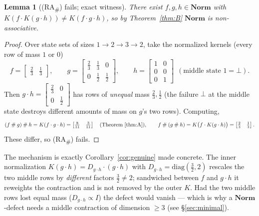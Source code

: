 \documentclass[11pt]{amsart}
\theoremstyle{plain}
\newtheorem{lemma}[theorem]{Lemma}
\theoremstyle{definition}
\theoremstyle{remark}
\newcommand{\Norm}{\mathbf{Norm}}
\newcommand{\sh}{\mathbin{\#}}
\newcommand{\RA}{\textsf{(RA}\textsubscript{\#}\textsf{)}}
\begin{document}
\begin{lemma}[\RA{} fails; exact witness]
\label{lem:norm-RA}
There exist $f,g,h\in\Norm$ with $K(f\cdot K(g\cdot h))\ne K(f\cdot g\cdot h)$, so by
Theorem~\ref{thm:B} $\Norm$ is non-associative.
\end{lemma}
\begin{proof}
Over state sets of sizes $1\to 2\to 3\to 2$, take the normalized kernels (every row of mass $1$ or
$0$)
\[
  f=\begin{bmatrix}\tfrac23 & \tfrac13\end{bmatrix},\qquad
  g=\begin{bmatrix}\tfrac23 & \tfrac13 & 0\\[2pt] 0 & \tfrac12 & \tfrac12\end{bmatrix},\qquad
  h=\begin{bmatrix}1&0\\0&0\\0&1\end{bmatrix}\ \ (\text{middle state }1=\bot).
\]
Then $g\cdot h=\begin{bmatrix}\tfrac23&0\\0&\tfrac12\end{bmatrix}$ has rows of \emph{unequal} mass
$\tfrac23,\tfrac12$ (the failure $\bot$ at the middle state destroys different amounts of mass on
$g$'s two rows). Computing,
\[
  (f\sh g)\sh h = K(f\cdot g\cdot h) = \begin{bmatrix}\tfrac{8}{11}&\tfrac{3}{11}\end{bmatrix}
  \quad(\text{Theorem~\ref{thm:A}}),\qquad
  f\sh(g\sh h) = K\big(f\cdot K(g\cdot h)\big) = \begin{bmatrix}\tfrac23&\tfrac13\end{bmatrix}.
\]
These differ, so \RA{} fails.
\end{proof}

The mechanism is exactly Corollary~\ref{cor:genuine} made concrete. The inner normalization
$K(g\cdot h)=D_{g\cdot h}\cdot(g\cdot h)$ with $D_{g\cdot h}=\mathrm{diag}(\tfrac32,2)$ rescales the two
middle rows by \emph{different} factors $\tfrac32\ne 2$; sandwiched between $f$ and $g\cdot h$ it
reweights the contraction and is not removed by the outer $K$. Had the two middle rows lost equal
mass ($D_{g\cdot h}\propto I$) the defect would vanish --- which is why a $\Norm$-defect needs a middle
contraction of dimension $\ge 3$ (see \S\ref{sec:minimal}).
\end{document}
